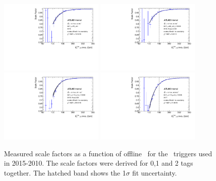 \begin{figure}[tb!]
	\centering
	\includegraphics[width=0.45\textwidth]{chapters/c6/figures/METTriggerCalibration/SF_HLT_xe70_mht.pdf}
	\includegraphics[width=0.45\textwidth]{chapters/c6/figures/METTriggerCalibration/SF_HLT_xe90_mht_L1XE50.pdf}
	\includegraphics[width=0.45\textwidth]{chapters/c6/figures/METTriggerCalibration/SF_HLT_xe110_mht_L1XE50.pdf}
	\includegraphics[width=0.45\textwidth]{chapters/c6/figures/METTriggerCalibration/SF_HLT_xe110_pufit_L1XE55.pdf}
	\caption{Measured scale factors as a function of offline \METnomu~for the \MET~triggers used in 2015-2010. The scale factors were derived for 0,1 and 2 tags together. The hatched band shows the 1$\sigma$ fit uncertainty.}
	\label{fig:TrigSF}
\end{figure}

